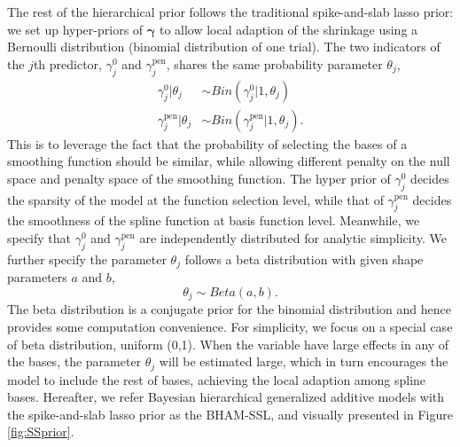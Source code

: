 \documentclass[AMA,STIX1COL,]{WileyNJD-v2}
\begin{document}
The rest of the hierarchical prior follows the traditional
spike-and-slab lasso prior: we set up hyper-priors of
\(\boldsymbol{\gamma}\) to allow local adaption of the shrinkage using a
Bernoulli distribution (binomial distribution of one trial). The two
indicators of the \(j\)th predictor, \(\gamma^{0}_j\) and
\(\gamma^\text{pen}_j\), shares the same probability parameter
\(\theta_j\), \[
\begin{aligned}
\gamma_{j}^{0} | \theta_j &\sim Bin(\gamma^{0}_{j}|1, \theta_j)\\
\gamma_{j}^\text{pen}| \theta_j &\sim Bin(\gamma^\text{pen}_{j}|1, \theta_j).
\end{aligned}
\] This is to leverage the fact that the probability of selecting the
bases of a smoothing function should be similar, while allowing
different penalty on the null space and penalty space of the smoothing
function. The hyper prior of \(\gamma_{j}^{0}\) decides the sparsity of
the model at the function selection level, while that of
\(\gamma_{j}^\text{pen}\) decides the smoothness of the spline function
at basis function level. Meanwhile, we specify that \(\gamma_{j}^0\) and
\(\gamma_{j}^\text{pen}\) are independently distributed for analytic
simplicity. We further specify the parameter \(\theta_j\) follows a beta
distribution with given shape parameters \(a\) and \(b\), \[
\theta_j \sim Beta(a, b).
\] The beta distribution is a conjugate prior for the binomial
distribution and hence provides some computation convenience. For
simplicity, we focus on a special case of beta distribution, uniform
(0,1). When the variable have large effects in any of the bases, the
parameter \(\theta_j\) will be estimated large, which in turn encourages
the model to include the rest of bases, achieving the local adaption
among spline bases. Hereafter, we refer Bayesian hierarchical
generalized additive models with the spike-and-slab lasso prior as the
BHAM-SSL, and visually presented in Figure \ref{fig:SSprior}.
\end{document}

